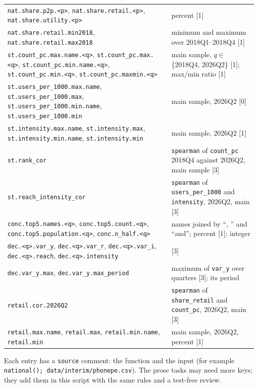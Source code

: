 \documentclass[10pt,a4paper]{article}
\newcommand{\f}[1]{\texttt{#1}}
\begin{document}
\begin{longtable}{@{}p{} p{}@{}}
\f{nat.share.p2p.<p>}, \f{nat.share.retail.<p>}, \f{nat.share.utility.<p>} & percent [1] \\
\f{nat.share.retail.min2018}, \f{nat.share.retail.max2018} & minimum and maximum over 2018Q1--2018Q4 [1] \\
\f{st.count\_pc.max.name.<q>}, \f{st.count\_pc.max.<q>}, \f{st.count\_pc.min.name.<q>}, \f{st.count\_pc.min.<q>},
  \f{st.count\_pc.maxmin.<q>} & main sample, $q \in$ \{2018Q4, 2026Q2\} [1]; max/min ratio [1] \\
\f{st.users\_per\_1000.max.name}, \f{st.users\_per\_1000.max}, \f{st.users\_per\_1000.min.name},
  \f{st.users\_per\_1000.min} & main sample, 2026Q2 [0] \\
\f{st.intensity.max.name}, \f{st.intensity.max}, \f{st.intensity.min.name}, \f{st.intensity.min} & main sample,
  2026Q2 [1] \\
\f{st.rank\_cor} & \f{spearman} of \f{count\_pc} 2018Q4 against 2026Q2, main sample [3] \\
\f{st.reach\_intensity\_cor} & \f{spearman} of \f{users\_per\_1000} and \f{intensity}, 2026Q2, main [3] \\
\f{conc.top5.names.<q>}, \f{conc.top5.count.<q>}, \f{conc.top5.population.<q>}, \f{conc.n\_half.<q>} & names
  joined by ``, '' and ``and''; percent [1]; integer \\
\f{dec.<q>.var\_y}, \f{dec.<q>.var\_r}, \f{dec.<q>.var\_i}, \f{dec.<q>.reach}, \f{dec.<q>.intensity} & [3] \\
\f{dec.var\_y.max}, \f{dec.var\_y.max\_period} & maximum of \f{var\_y} over quarters [3]; its period \\
\f{retail.cor.2026Q2} & \f{spearman} of \f{share\_retail} and \f{count\_pc}, 2026Q2, main [3] \\
\f{retail.max.name}, \f{retail.max}, \f{retail.min.name}, \f{retail.min} & main sample, 2026Q2, percent [1] \\
\bottomrule
\end{longtable}
Each entry has a \f{source} comment: the function and the input (for example
\f{national(); data/interim/phonepe.csv}). The prose tasks may need more keys; they add them in this script
with the same rules and a test-free review.
\end{document}
